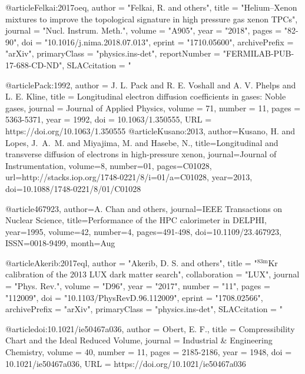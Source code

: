 @article{Felkai:2017oeq,
      author         = "Felkai, R. and others",
      title          = "{Helium–Xenon mixtures to improve the topological
                        signature in high pressure gas xenon TPCs}",
      journal        = "Nucl. Instrum. Meth.",
      volume         = "A905",
      year           = "2018",
      pages          = "82-90",
      doi            = "10.1016/j.nima.2018.07.013",
      eprint         = "1710.05600",
      archivePrefix  = "arXiv",
      primaryClass   = "physics.ins-det",
      reportNumber   = "FERMILAB-PUB-17-688-CD-ND",
      SLACcitation   = "%
}

@article{Pack:1992,
author = {J. L. Pack and R. E. Voshall and A. V. Phelps and L. E. Kline},
title = {Longitudinal electron diffusion coefficients in gases: Noble gases},
journal = {Journal of Applied Physics},
volume = {71},
number = {11},
pages = {5363-5371},
year = {1992},
doi = {10.1063/1.350555},
URL = { https://doi.org/10.1063/1.350555}
}
@article{Kusano:2013,
  author={Kusano, H. and Lopes, J.~A.~M. and Miyajima, M. and Hasebe, N.},
  title={Longitudinal and transverse diffusion of electrons in high-pressure xenon},
  journal={Journal of Instrumentation},
  volume={8},
  number={01},
  pages={C01028},
  url={http://stacks.iop.org/1748-0221/8/i=01/a=C01028},
  year={2013},
  doi={10.1088/1748-0221/8/01/C01028}
}

@article{467923, 
author={A. Chan and others}, 
journal={IEEE Transactions on Nuclear Science}, 
title={Performance of the HPC calorimeter in DELPHI}, 
year={1995}, 
volume={42}, 
number={4}, 
pages={491-498}, 
doi={10.1109/23.467923}, 
ISSN={0018-9499}, 
month={Aug}
}

@article{Akerib:2017eql,
      author         = "Akerib, D. S. and others",
      title          = "{$^{83\textrm{m}}$Kr calibration of the 2013 LUX dark
                        matter search}",
      collaboration  = "LUX",
      journal        = "Phys. Rev.",
      volume         = "D96",
      year           = "2017",
      number         = "11",
      pages          = "112009",
      doi            = "10.1103/PhysRevD.96.112009",
      eprint         = "1708.02566",
      archivePrefix  = "arXiv",
      primaryClass   = "physics.ins-det",
      SLACcitation   = "%
}

@article{doi:10.1021/ie50467a036,
author = {Obert, E. F.},
title = {Compressibility Chart and the Ideal Reduced Volume},
journal = {Industrial \& Engineering Chemistry},
volume = {40},
number = {11},
pages = {2185-2186},
year = {1948},
doi = {10.1021/ie50467a036},
URL = {https://doi.org/10.1021/ie50467a036}
}

